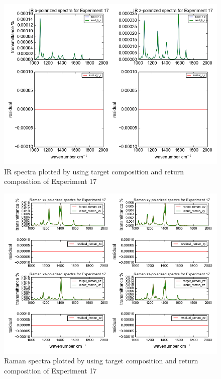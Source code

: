 \begin{figure}[!ht] 
\centering
\includegraphics[scale=0.5]{Figures/chapter4_result_target_plotting_5datapoint_ir.png}
\caption{IR spectra plotted by using target composition and return composition of Experiment 17} \label{fig:4.2}
\end{figure}

\begin{figure}[!ht] 
\centering
\includegraphics[scale=0.7]{Figures/chapter4_result_target_plotting_5datapoint_raman.png}
\caption{Raman spectra plotted by using target composition and return composition of Experiment 17} \label{fig:4.3}
\end{figure}

